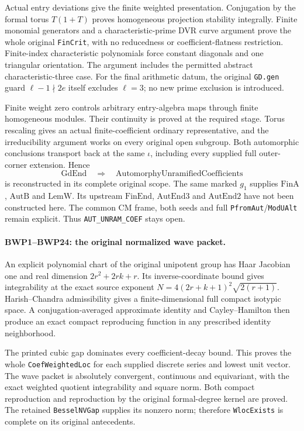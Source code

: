 Actual entry deviations give the finite weighted presentation.
Conjugation by the formal torus \(T(1+T)\) proves homogeneous
projection stability integrally. Finite monomial generators and a
characteristic-prime DVR curve argument prove the whole original
\texttt{FinCrit}, with no reducedness or coefficient-flatness
restriction. Finite-index characteristic polynomials force constant
diagonals and one triangular orientation. The argument includes
the permitted abstract characteristic-three case. For the final
arithmetic datum, the original \texttt{GD.gen} guard
\(\ell-1\nmid 2e\) itself excludes \(\ell=3\); no new
prime exclusion is introduced.

Finite weight zero controls arbitrary entry-algebra maps through
finite homogeneous modules. Their continuity is proved at the
required stage. Torus rescaling gives an actual finite-coefficient
ordinary representative, and the irreducibility argument works on
every original open subgroup. Both automorphic conclusions transport
back at the same \(\iota\), including every supplied full
outer-corner extension. Hence
\[
 \mathrm{GdEnd}\quad\Longrightarrow\quad
 \mathrm{AutomorphyUnramifiedCoefficients}
\]
is reconstructed in its complete original scope. The same marked
\(g_1\) supplies \(\mathrm{FinA}\), \(\mathrm{AutB}\) and
\(\mathrm{LemW}\). Its upstream \(\mathrm{FinEnd}\),
\(\mathrm{AutEnd3}\) and \(\mathrm{AutEnd2}\) have not been
constructed here. The common CM frame, both seeds and full
\texttt{PfromAut}/\texttt{ModUAlt} remain explicit.
Thus \texttt{AUT\_UNRAM\_COEF} stays open.

\paragraph{BWP1--BWP24: the original normalized wave packet.}
An explicit polynomial chart of the original unipotent group has
Haar Jacobian one and real dimension \(2r^2+2rk+r\).
Its inverse-coordinate bound gives integrability at the exact source
exponent \(N=4(2r+k+1)^2\sqrt{2(r+1)}\).
Harish--Chandra admissibility gives a finite-dimensional full compact
isotypic space. A conjugation-averaged approximate identity and
Cayley--Hamilton then produce an exact compact reproducing function
in any prescribed identity neighborhood.

The printed cubic gap dominates every coefficient-decay bound.
This proves the whole \texttt{CoefWeightedLoc} for each supplied
discrete series and lowest unit vector. The wave packet is absolutely
convergent, continuous and equivariant, with the exact weighted
quotient integrability and square norm. Both compact reproduction
and reproduction by the original formal-degree kernel are proved.
The retained \texttt{BesselNVGap} supplies its nonzero norm;
therefore \texttt{WlocExists} is complete on its original antecedents.


